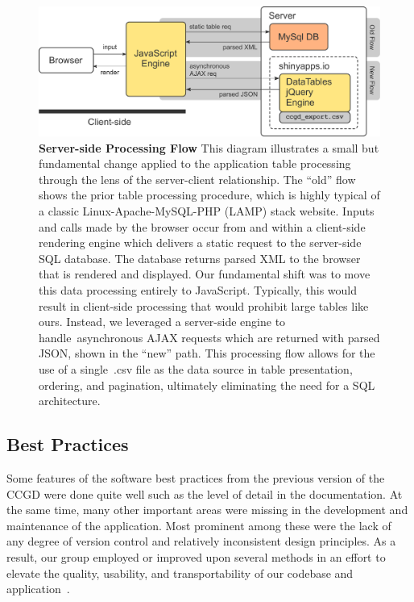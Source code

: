 \documentclass[10pt]{report}
\begin{document}
\begin{figure}[H]
    \centering
    \includegraphics[width=\textwidth]{fig/parse_flow.pdf}
    \caption[Server-side Processing Flow]{\textbf{Server-side Processing Flow} This diagram illustrates a small but fundamental change applied to the application table processing through the lens of the server-client relationship. The ``old'' flow shows the prior table processing procedure, which is highly typical of a classic Linux-Apache-MySQL-PHP (LAMP) stack website. Inputs and calls made by the browser occur from and within a client-side rendering engine which delivers a static request to the server-side SQL database. The database returns parsed XML to the browser that is rendered and displayed. Our fundamental shift was to move this data processing entirely to JavaScript. Typically, this would result in client-side processing that would prohibit large tables like ours. Instead, we leveraged a server-side engine to handle asynchronous AJAX requests which are returned with parsed JSON, shown in the ``new'' path. This processing flow allows for the use of a single~.csv file as the data source in table presentation, ordering, and pagination, ultimately eliminating the need for a SQL architecture.}\label{fig:parseFlow}
\end{figure}

\subsection{Best Practices}
Some features of the software best practices from the previous version of the CCGD were done quite well such as the level of detail in the documentation. At the same time, many other important areas were missing in the development and maintenance of the application. Most prominent among these were the lack of any degree of version control and relatively inconsistent design principles. As a result, our group employed or improved upon several methods in an effort to elevate the quality, usability, and transportability of our codebase and application~\cite{finchamSoftwareDevelopmentPractices2011}.
\end{document}

